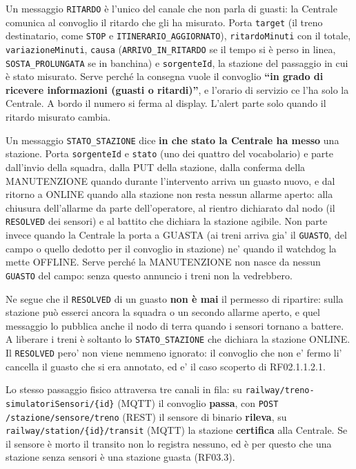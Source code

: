 \documentclass[11pt]{article}
\begin{document}
Un messaggio \texttt{RITARDO} è l'unico del canale che non parla di guasti: la Centrale comunica al
convoglio il ritardo che gli ha misurato. Porta \texttt{target} (il treno destinatario, come \texttt{STOP} e
\texttt{ITINERARIO\_AGGIORNATO}), \texttt{ritardoMinuti} con il totale, \texttt{variazioneMinuti}, \texttt{causa}
(\texttt{ARRIVO\_IN\_RITARDO} se il tempo si è perso in linea, \texttt{SOSTA\_PROLUNGATA} se in banchina) e
\texttt{sorgenteId}, la stazione del passaggio in cui è stato misurato. Serve perché la consegna vuole il
convoglio \textbf{``in grado di ricevere informazioni (guasti o ritardi)''}, e l'orario di servizio ce l'ha
solo la Centrale. A bordo il numero si ferma al display. L'alert parte solo quando il ritardo
misurato cambia.

Un messaggio \texttt{STATO\_STAZIONE} dice \textbf{in che stato la Centrale ha messo} una stazione. Porta
\texttt{sorgenteId} e \texttt{stato} (uno dei quattro del vocabolario) e parte dall'invio della squadra, dalla
PUT della stazione, dalla conferma della MANUTENZIONE quando durante l'intervento arriva un guasto
nuovo, e dal ritorno a ONLINE quando alla stazione non resta nessun allarme aperto: alla chiusura
dell'allarme da parte dell'operatore, al rientro dichiarato dal nodo (il \texttt{RESOLVED} dei sensori) e
al battito che dichiara la stazione agibile. Non parte invece quando la Centrale la porta a GUASTA
(ai treni arriva gia' il \texttt{GUASTO}, del campo o quello dedotto per il convoglio in stazione) ne'
quando il watchdog la mette OFFLINE.
Serve perché la MANUTENZIONE non nasce da nessun \texttt{GUASTO} del campo: senza questo annuncio i treni
non la vedrebbero.

Ne segue che il \texttt{RESOLVED} di un guasto \textbf{non è mai} il permesso di ripartire: sulla stazione può
esserci ancora la squadra o un secondo allarme aperto, e quel messaggio lo pubblica anche il nodo di
terra quando i sensori tornano a battere. A liberare i treni è soltanto lo \texttt{STATO\_STAZIONE} che
dichiara la stazione ONLINE. Il \texttt{RESOLVED} pero' non viene nemmeno ignorato: il convoglio che non e'
fermo li' cancella il guasto che si era annotato, ed e' il caso scoperto di RF02.1.1.2.1.

Lo stesso passaggio fisico attraversa tre canali in fila: su \texttt{railway/treno-simulatoriSensori/\{id\}}
(MQTT) il convoglio \textbf{passa}, con \texttt{POST /stazione/sensore/treno} (REST) il sensore di binario
\textbf{rileva}, su \texttt{railway/station/\{id\}/transit} (MQTT) la stazione \textbf{certifica} alla Centrale. Se il
sensore è morto il transito non lo registra nessuno, ed è per questo che una stazione senza sensori
è una stazione guasta (RF03.3).
\end{document}

